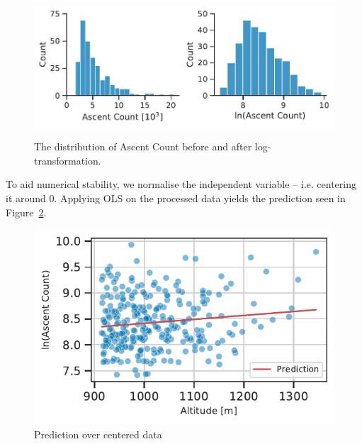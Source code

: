 \documentclass[11pt,a4paper]{article}
\begin{document}
\begin{figure} [h!]
  \centering
  \includegraphics{report/ascent_count_distribution.pdf}
  \begin{minipage}[t]{.5\linewidth}
        \centering
        \label{fds-project-template:fig:box_dist_ascents}
    \end{minipage}%
    \begin{minipage}[t]{.5\linewidth}
        \centering
        \label{fds-project-template:fig:box_dist_altitude}
    \end{minipage}
  \caption{The distribution of Ascent Count before and after log-transformation.}
  \label{fds-project-template:fig:ascent_count_distribution}
\end{figure}
To aid numerical stability, we normalise the independent variable – i.e. centering it around 0. Applying OLS on the processed data yields the prediction seen in Figure~\ref{fds-project-template:fig:q1_prediction}.
\begin{figure} [h!]
  \centering
  \includegraphics{report/q1_prediction.pdf}
  \caption{Prediction over centered data}
  \label{fds-project-template:fig:q1_prediction}
\end{figure} \\ \\
\end{document}
